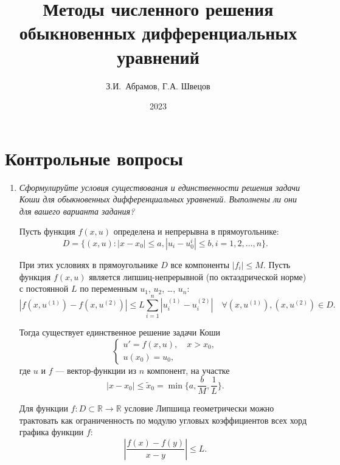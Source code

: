 \documentclass[12pt, a4paper]{article}
\title{Методы численного решения обыкновенных дифференциальных уравнений}
\author{З.И.~Абрамов, Г.А. Швецов}
\date{2023}
\begin{document}
	\newcommand{\pl}{\partial}
	\maketitle
	
	\tableofcontents
	
	\newpage
	
	\section{Контрольные вопросы}
	
	\begin{enumerate}
		\item \textit{Сформулируйте условия существования и единственности решения задачи Коши для обыкновенных дифференциальных уравнений. Выполнены ли они для вашего варианта задания?}
		\smallskip
		
		
		Пусть функция $f(x, u)$ определена и непрерывна в прямоугольнике:
		\[
		D = \{(x, u): |x-x_0| \le a, |u_i - u_0^i| \le b, i = 1, 2, \dots, n\}.
		\]
		
		При этих условиях в прямоугольнике $D$ все компоненты $|f_i| \le M$. Пусть функция $f(x, u)$ является липшиц-непрерывной (по октаэдрической норме) с постоянной $L$ по переменным $u_1$, $u_2$, \dots, $u_n$:
		\[
		|f(x, u^{(1)}) - f(x, u^{(2)})| \le L \sum_{i=1}^n |u_i^{(1)} - u_i^{(2)}| \quad \forall (x, u^{(1)}), (x, u^{(2)}) \in D.
		\]
		
		Тогда существует единственное решение задачи Коши
		\[
		\begin{cases}
			u' = f(x, u), \quad x > x_0, \\
			u(x_0) = u_0,
		\end{cases}
		\]
		где $u$ и $f$ --- вектор-функции из $n$ компонент, на участке
		\[
		|x-x_0| \le \tilde{x}_0 = \min\{a, \frac{b}{M}, \frac1L\}.
		\]
		
		Для функции $f:D \subset \mathbb{R} \to \mathbb{R}$ условие Липшица геометрически можно трактовать как ограниченность по модулю угловых коэффициентов всех хорд графика функции $f$:
		\[
		\left|\frac{f(x) - f(y)}{x-y}\right| \le L.
		\]
		

\end{enumerate}
\end{document}
